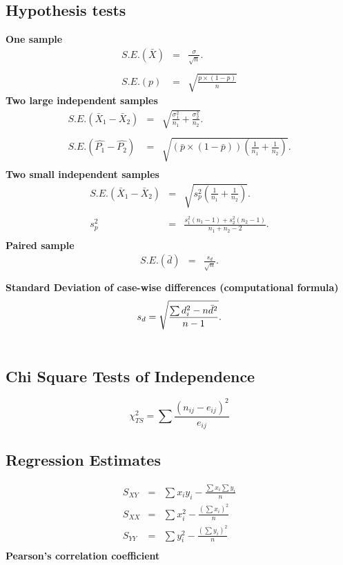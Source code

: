 \documentclass[a4paper,12pt]{article}
\begin{document}
\subsection*{Hypothesis tests}
{\bf One sample}
\begin{eqnarray*}
	S.E.(\bar{X})&=&\frac{\sigma}{\sqrt{n}}.\\\\
	S.E.(p)&=&\sqrt{\frac{p \times(1-p)}{n}}
\end{eqnarray*}
{\bf Two large independent samples}
\begin{eqnarray*}
	S.E.(\bar{X}_1-\bar{X}_2)&=&\sqrt{\frac{\sigma^2_1}{n_1}+\frac{\sigma_2^2}{n_2}}.\\\\
	S.E.(\hat{P_1}-\hat{P_2})&=&\sqrt{\left(\bar{p}\times(1-\bar{p})\right)\left(\frac{1}{n_1}+\frac{1}{n_2}\right)}.\\
\end{eqnarray*}
{\bf Two small independent samples}
\begin{eqnarray*}
	S.E.(\bar{X}_1-\bar{X}_2)&=&\sqrt{s_p^2\left(\frac{1}{n_1}+\frac{1}{n_2}\right)}.\\\\
	s_p^2&=&\frac{s_1^2(n_1-1)+s_2^2(n_2-1)}{n_1+n_2-2}.\\
\end{eqnarray*}
{\bf Paired sample}
\begin{eqnarray*}
	S.E.(\bar{d})&=&\frac{s_d}{\sqrt{n}}.\\\\
\end{eqnarray*}
{\bf Standard Deviation of case-wise differences (computational formula)}
\begin{eqnarray*}
	s_d = \sqrt{ {\sum d_i^2 - n\bar{d}^2 \over n-1}}.\\\\
\end{eqnarray*}
\subsection*{Chi Square Tests of Independence}
\[\chi^2_{TS} =  \sum \frac{(n_{ij} - e_{ij})^2}{e_{ij}}\]
\subsection*{Regression Estimates}

\begin{eqnarray*}
	S_{XY} &=&
	\sum x_iy_i - \frac{\sum x_i\sum y_i}{n}\\
	S_{XX} &=&
	\sum x_i^2 - \frac{(\sum x_i)^2}{n}\\
	S_{YY} &=&
	\sum y_i^2 - \frac{(\sum y_i)^2}{n}\\
\end{eqnarray*}
{\bf Pearson's correlation coefficient}
\end{document}
